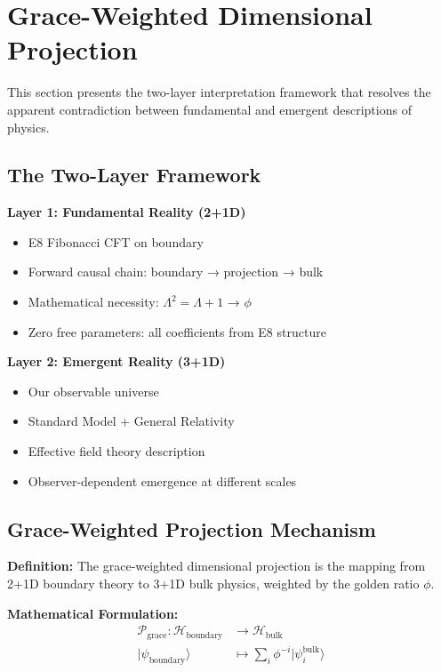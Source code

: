 \documentclass[11pt]{article}
\theoremstyle{definition}
\newcommand{\goldenratio}{\phi}
\begin{document}
\section{Grace-Weighted Dimensional Projection}

This section presents the two-layer interpretation framework that resolves the apparent contradiction between fundamental and emergent descriptions of physics.

\subsection{The Two-Layer Framework}

\textbf{Layer 1: Fundamental Reality (2+1D)}
\begin{itemize}
\item E8 Fibonacci CFT on boundary
\item Forward causal chain: boundary → projection → bulk
\item Mathematical necessity: $\Lambda^2 = \Lambda + 1$ → $\goldenratio$
\item Zero free parameters: all coefficients from E8 structure
\end{itemize}

\textbf{Layer 2: Emergent Reality (3+1D)}
\begin{itemize}
\item Our observable universe
\item Standard Model + General Relativity
\item Effective field theory description
\item Observer-dependent emergence at different scales
\end{itemize}

\subsection{Grace-Weighted Projection Mechanism}

\textbf{Definition:} The grace-weighted dimensional projection is the mapping from 2+1D boundary theory to 3+1D bulk physics, weighted by the golden ratio $\goldenratio$.

\textbf{Mathematical Formulation:}
\begin{align}
\mathcal{P}_{\text{grace}}: \mathcal{H}_{\text{boundary}} &\to \mathcal{H}_{\text{bulk}} \\
|\psi_{\text{boundary}}\rangle &\mapsto \sum_i \goldenratio^{-i} |\psi_i^{\text{bulk}}\rangle
\end{align}
\end{document}
